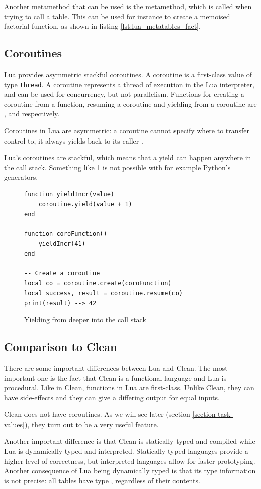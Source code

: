 Another metamethod that can be used is the  metamethod, which is called when trying to call a table. This can be used for instance to create a memoised factorial function, as shown in listing \ref{lst:lua_metatables_fact}.

\subsection{Coroutines}\label{section-lua-coroutines}
Lua provides asymmetric stackful coroutines. A coroutine is a first-class value of type \texttt{thread}. A coroutine represents a thread of execution in the Lua interpreter, and can be used for concurrency, but not parallelism. Functions for creating a coroutine from a function, resuming a coroutine and yielding from a coroutine are ,  and  respectively.

Coroutines in Lua are asymmetric: a coroutine cannot specify where to transfer control to, it always yields back to its caller \cite{moura2009revisiting}.

Lua's coroutines are stackful, which means that a yield can happen anywhere in the call stack. Something like \ref{lst:lua_coroutines} is not possible with for example Python's generators.

\begin{figure}[ht]
\centering
\begin{verbatim}
function yieldIncr(value)
    coroutine.yield(value + 1)
end

function coroFunction()
    yieldIncr(41)
end

-- Create a coroutine
local co = coroutine.create(coroFunction)
local success, result = coroutine.resume(co)
print(result) --> 42
\end{verbatim}
\caption{Yielding from deeper into the call stack}
\label{lst:lua_coroutines}
\end{figure}

\subsection{Comparison to Clean}
There are some important differences between Lua and Clean. The most important one is the fact that Clean is a functional language and Lua is procedural. Like in Clean, functions in Lua are first-class. Unlike Clean, they can have side-effects and they can give a differing output for equal inputs.

Clean does not have coroutines. As we will see later (section \ref{section-task-values}), they turn out to be a very useful feature.

Another important difference is that Clean is statically typed and compiled while Lua is dynamically typed and interpreted. Statically typed languages provide a higher level of correctness, but interpreted languages allow for faster prototyping. Another consequence of Lua being dynamically typed is that its type information is not precise: all tables have type , regardless of their contents.

